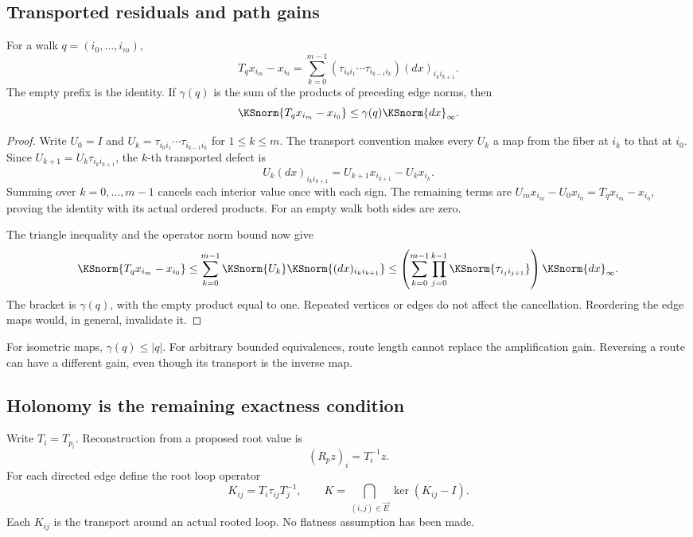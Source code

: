 \subsection{Transported residuals and path gains}
\begin{KSproposition}\label{KS:KS40}
For a walk \(q=(i_0,\ldots,i_m)\),
\[
 T_qx_{i_m}-x_{i_0}
 =\sum_{k=0}^{m-1}
 (\tau_{i_0i_1}\cdots\tau_{i_{k-1}i_k})(dx)_{i_ki_{k+1}}.
\]
The empty prefix is the identity. If \(\gamma(q)\) is the sum of the products of preceding edge norms, then
\[
 \KSnorm{T_qx_{i_m}-x_{i_0}}\le\gamma(q)\KSnorm{dx}_\infty.
\]
\end{KSproposition}
\begin{proof}
Write \(U_0=I\) and \(U_k=\tau_{i_0i_1}\cdots\tau_{i_{k-1}i_k}\) for \(1\le k\le m\). The transport convention makes every \(U_k\) a map from the fiber at \(i_k\) to that at \(i_0\). Since \(U_{k+1}=U_k\tau_{i_ki_{k+1}}\), the \(k\)-th transported defect is
\[
 U_k(dx)_{i_ki_{k+1}}
 =U_{k+1}x_{i_{k+1}}-U_kx_{i_k}.
\]
Summing over \(k=0,\ldots,m-1\) cancels each interior value once with each sign. The remaining terms are \(U_mx_{i_m}-U_0x_{i_0}=T_qx_{i_m}-x_{i_0}\), proving the identity with its actual ordered products. For an empty walk both sides are zero.

The triangle inequality and the operator norm bound now give
\[
 \KSnorm{T_qx_{i_m}-x_{i_0}}
 \le\sum_{k=0}^{m-1}\KSnorm{U_k}\KSnorm{(dx)_{i_ki_{k+1}}}
 \le\left(\sum_{k=0}^{m-1}\prod_{j=0}^{k-1}\KSnorm{\tau_{i_ji_{j+1}}}\right)\KSnorm{dx}_\infty.
\]
The bracket is \(\gamma(q)\), with the empty product equal to one. Repeated vertices or edges do not affect the cancellation. Reordering the edge maps would, in general, invalidate it.
\end{proof}
For isometric maps, \(\gamma(q)\le|q|\). For arbitrary bounded equivalences, route length cannot replace the amplification gain. Reversing a route can have a different gain, even though its transport is the inverse map.

\subsection{Holonomy is the remaining exactness condition}
Write \(T_i=T_{p_i}\). Reconstruction from a proposed root value is
\[
 (R_pz)_i=T_i^{-1}z.
\]
For each directed edge define the root loop operator
\[
 K_{ij}=T_i\tau_{ij}T_j^{-1},\qquad
 K=\bigcap_{(i,j)\in\vec E}\ker(K_{ij}-I).
\]
Each \(K_{ij}\) is the transport around an actual rooted loop. No flatness assumption has been made.


